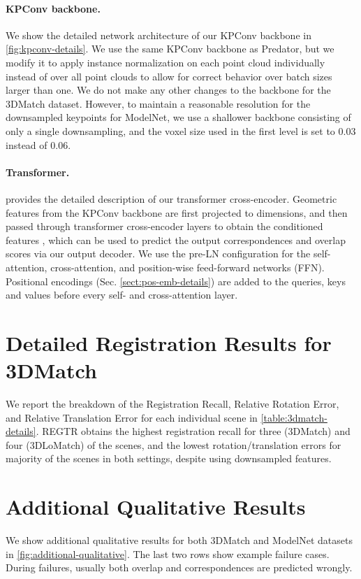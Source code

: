 \documentclass[10pt,twocolumn,letterpaper]{article}
\begin{document}
\paragraph{KPConv backbone.}
We show the detailed network architecture of our KPConv \cite{thomas2019kpconv} backbone in \cref{fig:kpconv-details}.
We use the same KPConv backbone as Predator, but we modify it to apply instance normalization on each point cloud individually instead of over all point clouds to allow for correct behavior over batch sizes larger than one. We do not make any other changes to the backbone for the 3DMatch dataset. However, to maintain a reasonable resolution for the downsampled keypoints for ModelNet, we use a shallower backbone consisting of only a single downsampling, and the voxel size used in the first level is set to 0.03 instead of 0.06. 

\vspace{-2mm}
\paragraph{Transformer.}
 provides the detailed description of our transformer cross-encoder. Geometric features from the KPConv backbone are first projected to  dimensions, and then passed through  transformer cross-encoder layers to obtain the conditioned features , which can be used to predict the output correspondences and overlap scores via our output decoder.
We use the pre-LN \cite{xiong2020prenorm} configuration for the self-attention, cross-attention, and position-wise feed-forward networks (FFN). Positional encodings (Sec. \ref{sect:pos-emb-details}) are added to the queries, keys and values before every self- and cross-attention layer.

\section{Detailed Registration Results for 3DMatch}\label{sect:scannet-results-details}
We report the breakdown of the Registration Recall, Relative Rotation Error, and Relative Translation Error for each individual scene in \cref{table:3dmatch-details}. REGTR obtains the highest registration recall for three (3DMatch) and four (3DLoMatch) of the scenes, and the lowest rotation/translation errors for majority of the scenes in both settings, despite using downsampled features.

\section{Additional Qualitative Results}\label{sect:additional-qualitative}
We show additional qualitative results for both 3DMatch and ModelNet datasets in \cref{fig:additional-qualitative}. The last two rows show example failure cases. During failures, usually both overlap and correspondences are predicted wrongly.
\end{document}
